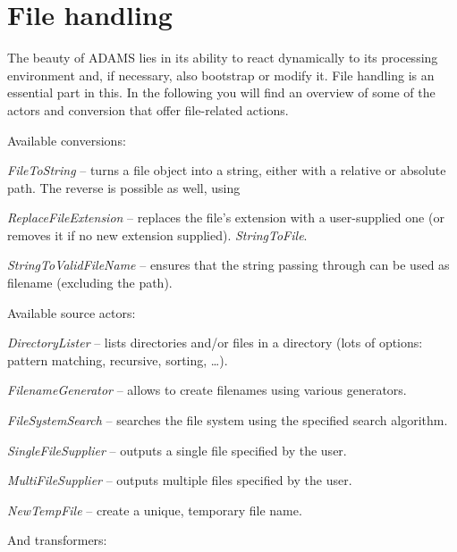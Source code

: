 \newpage
\section{File handling}
\label{file_handling}
The beauty of ADAMS lies in its ability to react dynamically to its processing
environment and, if necessary, also bootstrap or modify it. File handling is an
essential part in this. In the following you will find an overview of some of
the actors and conversion that offer file-related actions.

Available conversions:
\begin{tight_itemize}
	\item \textit{FileToString} -- turns a file object into a string, either with a 
	relative or absolute path. The reverse is possible as well, using
	\item \textit{ReplaceFileExtension} -- replaces the file's extension with
	a user-supplied one (or removes it if no new extension supplied).
	\textit{StringToFile}.
	\item \textit{StringToValidFileName} -- ensures that the string passing through can 
	be used as filename (excluding the path).
\end{tight_itemize}
Available source actors:
\begin{tight_itemize}
	\item \textit{DirectoryLister} -- lists directories and/or files in a
	directory (lots of options: pattern matching, recursive, sorting, \ldots).
	\item \textit{FilenameGenerator} -- allows to create filenames using various
	generators.
	\item \textit{FileSystemSearch} -- searches the file system using the
	specified search algorithm.
	\item \textit{SingleFileSupplier} -- outputs a single file specified by the
	user.
	\item \textit{MultiFileSupplier} -- outputs multiple files specified by the
	user.
	\item \textit{NewTempFile} -- create a unique, temporary file name.
\end{tight_itemize}
And transformers:
